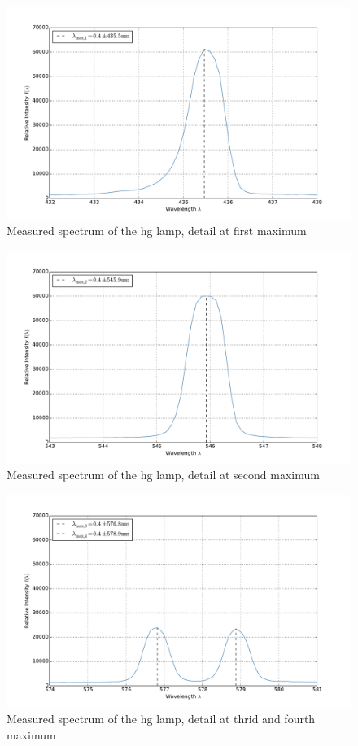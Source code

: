 \begin{figure}
\centering
\includegraphics[width=\pltw]{analysis/figures/hg1_max.pdf}
\caption{Measured spectrum of the hg lamp, detail at first maximum}
\label{fig:hg1_max}
\end{figure}

\begin{figure}
\centering
\includegraphics[width=\pltw]{analysis/figures/hg2_max.pdf}
\caption{Measured spectrum of the hg lamp, detail at second maximum}
\label{fig:hg2_max}
\end{figure}

\begin{figure}
\centering
\includegraphics[width=\pltw]{analysis/figures/hg3_max.pdf}
\caption{Measured spectrum of the hg lamp, detail at thrid and fourth maximum}
\label{fig:hg3_max}
\end{figure}

